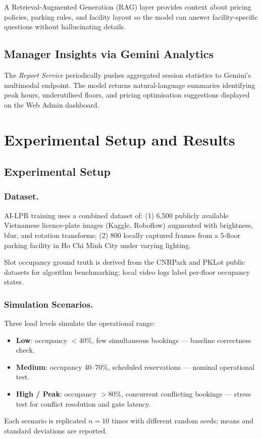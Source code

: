 \documentclass[runningheads]{llncs}
\begin{document}
A Retrieval-Augmented Generation (RAG) layer provides
context about pricing policies, parking rules, and facility
layout so the model can answer facility-specific questions
without hallucinating details.

\subsection{Manager Insights via Gemini Analytics}

The \emph{Report Service} periodically pushes aggregated
session statistics to Gemini's multimodal endpoint. The
model returns natural-language summaries identifying peak
hours, underutilised floors, and pricing optimisation
suggestions displayed on the Web Admin dashboard.

\section{Experimental Setup and Results}
\label{sec:eval}

\subsection{Experimental Setup}

\subsubsection{Dataset.}
AI-LPR training uses a combined dataset of:
(1) 6,500 publicly available Vietnamese licence-plate images
    (Kaggle, Roboflow) augmented with brightness, blur, and
    rotation transforms;
(2) 800 locally captured frames from a 5-floor parking
    facility in Ho Chi Minh City under varying lighting.

Slot occupancy ground truth is derived from the CNRPark and
PKLot public datasets for algorithm benchmarking; local video
logs label per-floor occupancy states.

\subsubsection{Simulation Scenarios.}
Three load levels simulate the operational range:
\begin{itemize}
  \item \textbf{Low}: occupancy $< 40\%$, few simultaneous
        bookings --- baseline correctness check.
  \item \textbf{Medium}: occupancy 40--70\%, scheduled
        reservations --- nominal operational test.
  \item \textbf{High / Peak}: occupancy $> 80\%$,
        concurrent conflicting bookings --- stress test for
        conflict resolution and gate latency.
\end{itemize}
Each scenario is replicated $n = 10$ times with different
random seeds; means and standard deviations are reported.
\end{document}
